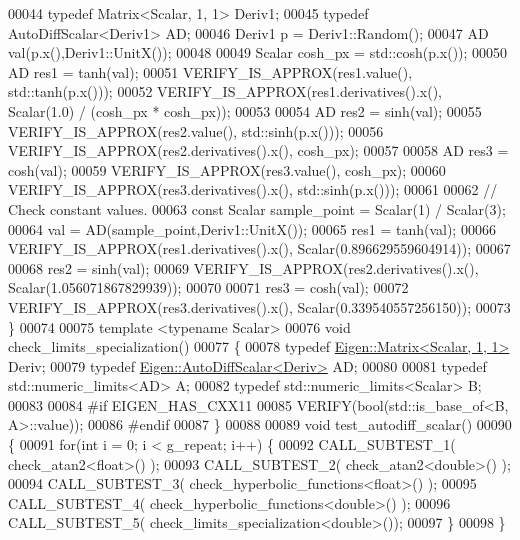 \begin{DoxyCode}
00044   \textcolor{keyword}{typedef} Matrix<Scalar, 1, 1> Deriv1;
00045   \textcolor{keyword}{typedef} AutoDiffScalar<Deriv1> AD;
00046   Deriv1 p = Deriv1::Random();
00047   AD val(p.x(),Deriv1::UnitX());
00048 
00049   Scalar cosh\_px = std::cosh(p.x());
00050   AD res1 = tanh(val);
00051   VERIFY\_IS\_APPROX(res1.value(), std::tanh(p.x()));
00052   VERIFY\_IS\_APPROX(res1.derivatives().x(), Scalar(1.0) / (cosh\_px * cosh\_px));
00053 
00054   AD res2 = sinh(val);
00055   VERIFY\_IS\_APPROX(res2.value(), std::sinh(p.x()));
00056   VERIFY\_IS\_APPROX(res2.derivatives().x(), cosh\_px);
00057 
00058   AD res3 = cosh(val);
00059   VERIFY\_IS\_APPROX(res3.value(), cosh\_px);
00060   VERIFY\_IS\_APPROX(res3.derivatives().x(), std::sinh(p.x()));
00061 
00062   \textcolor{comment}{// Check constant values.}
00063   \textcolor{keyword}{const} Scalar sample\_point = Scalar(1) / Scalar(3); 
00064   val = AD(sample\_point,Deriv1::UnitX());
00065   res1 = tanh(val);
00066   VERIFY\_IS\_APPROX(res1.derivatives().x(), Scalar(0.896629559604914));
00067 
00068   res2 = sinh(val);
00069   VERIFY\_IS\_APPROX(res2.derivatives().x(), Scalar(1.056071867829939));
00070 
00071   res3 = cosh(val);
00072   VERIFY\_IS\_APPROX(res3.derivatives().x(), Scalar(0.339540557256150));
00073 \}
00074 
00075 \textcolor{keyword}{template} <\textcolor{keyword}{typename} Scalar>
00076 \textcolor{keywordtype}{void} check\_limits\_specialization()
00077 \{
00078   \textcolor{keyword}{typedef} \hyperlink{group___core___module_class_eigen_1_1_matrix}{Eigen::Matrix<Scalar, 1, 1>} Deriv;
00079   \textcolor{keyword}{typedef} \hyperlink{class_eigen_1_1_auto_diff_scalar}{Eigen::AutoDiffScalar<Deriv>} AD;
00080 
00081   \textcolor{keyword}{typedef} std::numeric\_limits<AD> A;
00082   \textcolor{keyword}{typedef} std::numeric\_limits<Scalar> B;
00083 
00084 \textcolor{preprocessor}{#if EIGEN\_HAS\_CXX11}
00085   VERIFY(\textcolor{keywordtype}{bool}(std::is\_base\_of<B, A>::value));
00086 \textcolor{preprocessor}{#endif}
00087 \}
00088 
00089 \textcolor{keywordtype}{void} test\_autodiff\_scalar()
00090 \{
00091   \textcolor{keywordflow}{for}(\textcolor{keywordtype}{int} i = 0; i < g\_repeat; i++) \{
00092     CALL\_SUBTEST\_1( check\_atan2<float>() );
00093     CALL\_SUBTEST\_2( check\_atan2<double>() );
00094     CALL\_SUBTEST\_3( check\_hyperbolic\_functions<float>() );
00095     CALL\_SUBTEST\_4( check\_hyperbolic\_functions<double>() );
00096     CALL\_SUBTEST\_5( check\_limits\_specialization<double>());
00097   \}
00098 \}
\end{DoxyCode}
